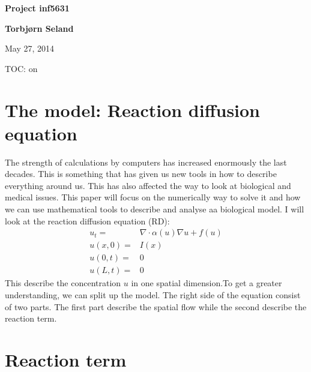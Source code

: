 \documentclass{article}
\begin{document}

\begin{center}
{\LARGE\bf Project inf5631}
\end{center}





\begin{center}
{\bf Torbjørn Seland${}^{}$} \\ [0mm]
\end{center}

\begin{center}
\end{center}





\begin{center}
May 27, 2014
\end{center}


TOC: on


\section{The model: Reaction diffusion equation}

The strength of calculations by computers has increased enormously the last
decades. This is something that has given us new
tools in how to describe everything around us. This has also affected the way to
look at biological and medical issues. This
paper will focus on the numerically way to solve it and how we can use
mathematical tools to describe and analyse aa biological model. I will look at 
the reaction diffusion equation (RD):
\begin{align} \label{eq:reaction_diffusion}
u_t =& \nabla \cdot \alpha(u)\nabla u + f(u)\\
u(x,0) =& I(x)\\
u(0,t)=& 0\\
u(L,t)=& 0
\end{align}
This describe the concentration $u$ in
one spatial dimension.To get a greater understanding, we can split up the model. The right side of the equation consist of two parts. The
first part describe the spatial flow while the second describe the reaction
term.


\section{Reaction term}
\end{document}
